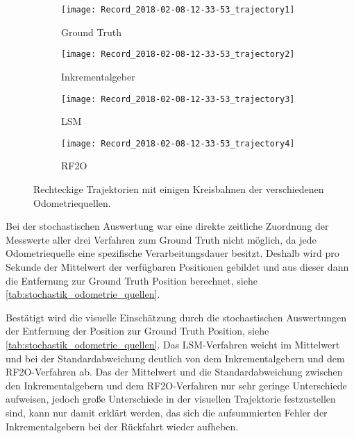 \begin{figure}
	\centering
	\begin{subfigure}{0.49\linewidth}
		\centering
		\texttt{[image: Record\_2018-02-08-12-33-53\_trajectory1]}
		\caption{Ground Truth}
		\label{fig:Record_2018-02-08-12-33-53_trajectory1}
	\end{subfigure}
	\hfill
	\begin{subfigure}{0.49\linewidth}
		\centering
		\texttt{[image: Record\_2018-02-08-12-33-53\_trajectory2]}
		\caption{Inkrementalgeber}
		\label{fig:Record_2018-02-08-12-33-53_trajectory2}
	\end{subfigure}
	\par
	\bigskip
	\begin{subfigure}{0.49\linewidth}
		\centering
		\texttt{[image: Record\_2018-02-08-12-33-53\_trajectory3]}
		\caption{LSM}
		\label{fig:Record_2018-02-08-12-33-53_trajectory3}
	\end{subfigure}
	\hfill
	\begin{subfigure}{0.49\linewidth}
		\centering
		\texttt{[image: Record\_2018-02-08-12-33-53\_trajectory4]}
		\caption{RF2O}
		\label{fig:Record_2018-02-08-12-33-53_trajectory4}
	\end{subfigure}
	\caption{Rechteckige Trajektorien mit einigen Kreisbahnen der verschiedenen Odometriequellen.}
	\label{fig:Record_2018-02-08-12-33-53_trajectory}
\end{figure}

Bei der stochastischen Auswertung war eine direkte zeitliche Zuordnung der Messwerte aller drei Verfahren zum Ground Truth nicht möglich, da jede Odometriequelle eine spezifische Verarbeitungsdauer besitzt. Deshalb wird pro Sekunde der Mittelwert der verfügbaren Positionen gebildet und aus dieser dann die Entfernung zur Ground Truth Position berechnet, siehe \autoref{tab:stochastik_odometrie_quellen}.

Bestätigt wird die visuelle Einschätzung durch die stochastischen Auswertungen der Entfernung der Position zur Ground Truth Position, siehe \autoref{tab:stochastik_odometrie_quellen}. Das LSM-Verfahren weicht im Mittelwert und bei der Standardabweichung deutlich von dem Inkrementalgebern und dem RF2O-Verfahren ab. Das der Mittelwert und die Standardabweichung zwischen den Inkrementalgebern und dem RF2O-Verfahren nur sehr geringe Unterschiede aufweisen, jedoch große Unterschiede in der visuellen Trajektorie festzustellen sind, kann nur damit erklärt werden, das sich die aufsummierten Fehler der Inkrementalgebern bei der Rückfahrt wieder aufheben.

